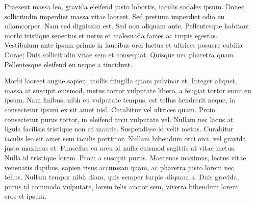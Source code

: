 \documentclass{article}
\begin{document}
  Praesent massa leo, gravida eleifend justo lobortis, iaculis sodales ipsum. Donec sollicitudin imperdiet massa vitae laoreet. Sed pretium imperdiet odio eu ullamcorper. Nam sed dignissim est. Sed non aliquam ante. Pellentesque habitant morbi tristique senectus et netus et malesuada fames ac turpis egestas. Vestibulum ante ipsum primis in faucibus orci luctus et ultrices posuere cubilia Curae; Duis sollicitudin vitae sem et consequat. Quisque nec pharetra quam. Pellentesque eleifend eu neque a tincidunt.\stopmsdata


  Morbi laoreet augue sapien, mollis fringilla quam pulvinar et. Integer aliquet, massa at suscipit euismod, metus tortor vulputate libero, a feugiat tortor enim eu ipsum. Nam finibus, nibh eu vulputate tempus, est tellus hendrerit neque, in consectetur ipsum ex sit amet nisl. Curabitur vel ultrices quam. Proin consectetur purus tortor, in eleifend arcu vulputate vel. Nullam nec lacus at ligula facilisis tristique non at mauris. Suspendisse id velit metus. Curabitur iaculis leo sit amet sem iaculis porttitor. Nullam bibendum orci orci, vel gravida justo maximus et. Phasellus eu arcu id nulla euismod sagittis at vitae metus. Nulla id tristique lorem. Proin a suscipit purus. Maecenas maximus, lectus vitae venenatis dapibus, sapien risus accumsan quam, ac pharetra justo lorem nec tellus. Nullam tempor nibh diam, quis semper turpis aliquam a. Duis gravida, \stopmsdata{}purus id commodo vulputate, lorem felis auctor sem, viverra bibendum lorem eros et ipsum.

\endnumbering
\end{document}
